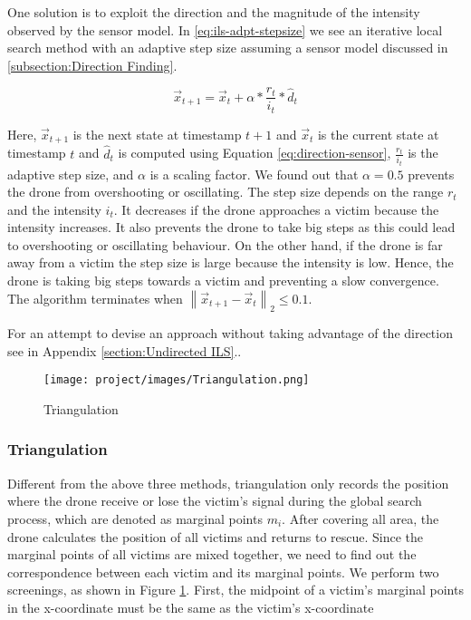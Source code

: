 \documentclass[conference]{IEEEtran}
\begin{document}
One solution is to exploit the direction and the magnitude of the intensity observed by the sensor model. In \eqref{eq:ils-adpt-stepsize} we see an iterative local search method with an adaptive step size assuming a sensor model discussed in \ref{subsection:Direction Finding}.

\begin{equation}
\Vec{x}_{t+1} = \Vec{x}_{t} + \alpha*\frac{r_{t}}{i_{t}}*\hat{d}_{t}\label{eq:ils-adpt-stepsize}
\end{equation}

Here, $\Vec{x}_{t+1}$ is the next state at timestamp $t+1$ and $\Vec{x}_{t}$ is the current state at timestamp $t$ and $\hat{d}_{t}$ is computed using Equation \eqref{eq:direction-sensor}, $\frac{r_{t}}{i_{t}}$ is the adaptive step size, and $\alpha$ is a scaling factor. We found out that $\alpha = 0.5$ prevents the drone from overshooting or oscillating. The step size depends on the range $r_{t}$ and the intensity $i_{t}$. It decreases if the drone approaches a victim because the intensity increases. It also prevents the drone to take big steps as this could lead to overshooting or oscillating behaviour. On the other hand, if the drone is far away from a victim the step size is large because the intensity is low. Hence, the drone is taking big steps towards a victim and preventing a slow convergence. The algorithm terminates when $\left\|\Vec{x}_{t+1} - \Vec{x}_{t}\right\|_2 \leq 0.1$. 

For an attempt to devise an approach without taking advantage of the direction see in Appendix \ref{section:Undirected ILS}.. 

\begin{figure}[h!]
    \centering
    \texttt{[image: project/images/Triangulation.png]}
    \caption{Triangulation}
    \label{fig:Triangulation}
\end{figure}

\subsubsection{Triangulation}
Different from the above three methods, triangulation only records the position where the drone receive or lose the victim's signal during the global search process, which are denoted as marginal points $m_i$. After covering all area, the drone calculates the position of all victims and returns to rescue. Since the marginal points of all victims are mixed together, we need to find out the correspondence between each victim and its marginal points.
We perform two screenings, as shown in Figure \ref{fig:Triangulation}. First, the midpoint of a victim's marginal points in the x-coordinate must be the same as the victim's x-coordinate
\end{document}
